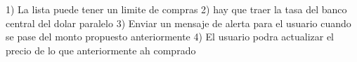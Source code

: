 1) La lista puede tener un limite de compras
2) hay que traer la tasa del banco central del dolar paralelo 
3) Enviar un mensaje de alerta para el usuario cuando se pase del monto propuesto anteriormente
4) El usuario podra actualizar el precio de lo que anteriormente ah comprado

